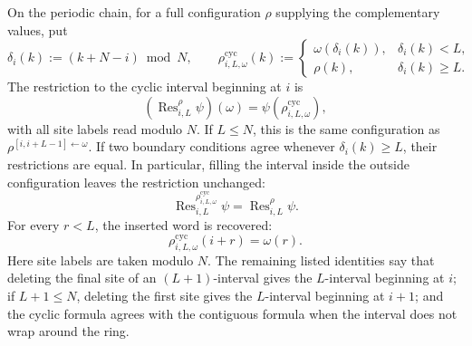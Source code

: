 \begin{remark}\label{rem:cyclic_window_operators}
    \leanok
    On the periodic chain, for a full configuration $\rho$ supplying the
    complementary values, put
    \[
        \delta_i(k) := (k+N-i)\bmod N,\qquad
        \rho^{\mathrm{cyc}}_{i,L,\omega}(k)
        :=
        \begin{cases}
            \omega(\delta_i(k)), & \delta_i(k)<L,    \\
            \rho(k),             & \delta_i(k)\ge L.
        \end{cases}
    \]
    The restriction to the cyclic interval beginning at $i$ is
    \[
        (\operatorname{Res}^{\rho}_{i,L}\psi)(\omega)
        =
        \psi\!\left(\rho^{\mathrm{cyc}}_{i,L,\omega}\right),
    \]
    with all site labels read modulo $N$. If $L\le N$, this is the same
    configuration as $\rho^{[i,i+L-1]\leftarrow\omega}$. If two boundary
    conditions agree whenever $\delta_i(k)\ge L$, their restrictions are equal.
    In particular, filling the interval inside the outside configuration leaves the
    restriction unchanged:
    \[
        \operatorname{Res}^{\rho^{\mathrm{cyc}}_{i,L,\omega}}_{i,L}\psi
        =
        \operatorname{Res}^{\rho}_{i,L}\psi.
    \]
    For every $r<L$, the inserted word is recovered:
    \[
        \rho^{\mathrm{cyc}}_{i,L,\omega}(i+r)=\omega(r).
    \]
    Here site labels are taken modulo $N$. The remaining listed identities say that
    deleting the final site of an $(L+1)$-interval gives the $L$-interval
    beginning at $i$; if $L+1\le N$, deleting the first site gives the
    $L$-interval beginning at $i+1$; and the cyclic formula agrees with the
    contiguous formula when the interval does not wrap around the ring.
\end{remark}

